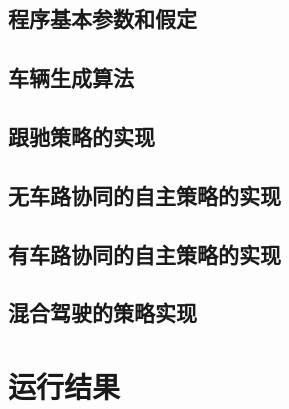 \documentclass[UTF8,a4paper]{ctexart}
\begin{document}
\subsection{程序基本参数和假定}
\subsection{车辆生成算法}
\subsection{跟驰策略的实现}
\subsection{无车路协同的自主策略的实现}
\subsection{有车路协同的自主策略的实现}
\subsection{混合驾驶的策略实现}
\section{运行结果}
\end{document}

